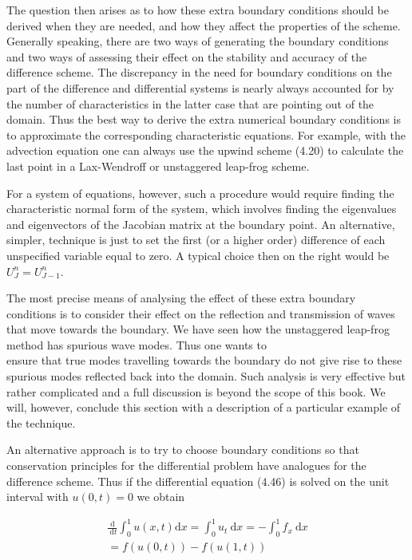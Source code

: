 \documentclass[10pt]{article}
\begin{document}
The question then arises as to how these extra boundary conditions should be derived when they are needed, and how they affect the properties of the scheme. Generally speaking, there are two ways of generating the boundary conditions and two ways of assessing their effect on the stability and accuracy of the difference scheme. The discrepancy in the need for boundary conditions on the part of the difference and differential systems is nearly always accounted for by the number of characteristics in the latter case that are pointing out of the domain. Thus the best way to derive the extra numerical boundary conditions is to approximate the corresponding characteristic equations. For example, with the advection equation one can always use the upwind scheme (4.20) to calculate the last point in a Lax-Wendroff or unstaggered leap-frog scheme.

For a system of equations, however, such a procedure would require finding the characteristic normal form of the system, which involves finding the eigenvalues and eigenvectors of the Jacobian matrix at the boundary point. An alternative, simpler, technique is just to set the first (or a higher order) difference of each unspecified variable equal to zero. A typical choice then on the right would be \(U_{J}^{n}=U_{J-1}^{n}\).

The most precise means of analysing the effect of these extra boundary conditions is to consider their effect on the reflection and transmission of waves that move towards the boundary. We have seen how the unstaggered leap-frog method has spurious wave modes. Thus one wants to\\
ensure that true modes travelling towards the boundary do not give rise to these spurious modes reflected back into the domain. Such analysis is very effective but rather complicated and a full discussion is beyond the scope of this book. We will, however, conclude this section with a description of a particular example of the technique.

An alternative approach is to try to choose boundary conditions so that conservation principles for the differential problem have analogues for the difference scheme. Thus if the differential equation (4.46) is solved on the unit interval with \(u(0, t)=0\) we obtain

\[
\begin{gathered}
\frac{\mathrm{d}}{\mathrm{~d} t} \int_{0}^{1} u(x, t) \mathrm{d} x=\int_{0}^{1} u_{t} \mathrm{~d} x=-\int_{0}^{1} f_{x} \mathrm{~d} x \\
=f(u(0, t))-f(u(1, t))
\end{gathered}
\]
\end{document}
